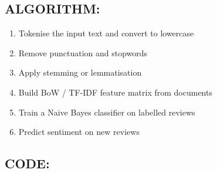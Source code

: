 \documentclass[12pt,a4paper]{article}
\begin{document}
\subsection{ALGORITHM:}

\begin{enumerate}
    \item Tokenise the input text and convert to lowercase
    \item Remove punctuation and stopwords
    \item Apply stemming or lemmatisation
    \item Build BoW / TF-IDF feature matrix from documents
    \item Train a Naive Bayes classifier on labelled reviews
    \item Predict sentiment on new reviews
\end{enumerate}

\subsection{CODE:}
\end{document}
